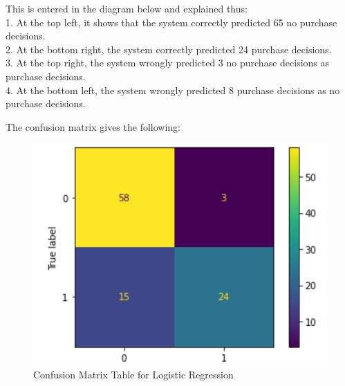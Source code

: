 \documentclass[conference]{IEEEtran}
\begin{document}
This is entered in the diagram below and explained thus:\\
1.	At the top left, it shows that the system correctly predicted 65 no purchase decisions.\\
2.	At the bottom right, the system correctly predicted 24 purchase decisions.\\
3.	At the top right, the system wrongly predicted 3 no purchase decisions as purchase decisions.\\
4.	At the bottom left, the system wrongly predicted 8 purchase decisions as no purchase decisions.

The confusion matrix gives the following:\\
\begin{figure}[h]
    \centering
    \includegraphics[scale=0.47]{figs/PredictL.png}
    \caption{Confusion Matrix Table for Logistic Regression}
    \label{dabc}        
\end{figure}


\end{document}
